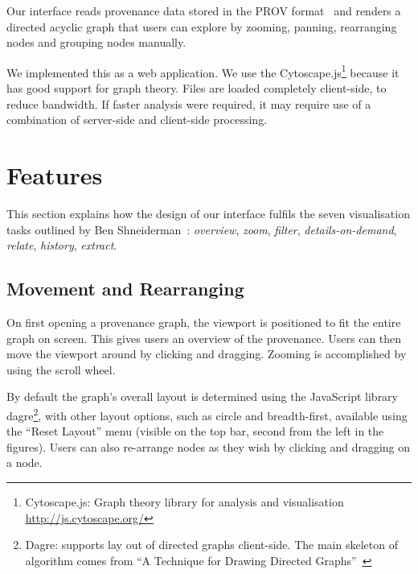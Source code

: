 Our interface reads provenance data stored in the PROV format~\cite{primer2013} and renders a directed acyclic graph that users can explore by zooming, panning, rearranging nodes and grouping nodes manually. 

We implemented this as a web application. We use the Cytoscape.js\footnote{Cytoscape.js: Graph theory library for analysis and visualisation \url{http://js.cytoscape.org/}} because it has good support for graph theory. 
Files are loaded completely client-side, to reduce bandwidth. If faster analysis were required, it may require use of a combination of server-side and client-side processing.


\section{Features}

This section explains how the design of our interface fulfils the seven visualisation tasks outlined by Ben Shneiderman~\cite{Shneiderman1996}: \textit{overview}, \textit{zoom}, \textit{filter}, \textit{details-on-demand}, \textit{relate}, \textit{history}, \textit{extract}. 

\subsection{Movement and Rearranging}
On first opening a provenance graph, the viewport is positioned to fit the entire graph on screen. This gives users an overview of the provenance. Users can then move the viewport around by clicking and dragging. Zooming is accomplished by using the scroll wheel. 

By default the graph's overall layout is determined using the JavaScript library dagre\footnote{Dagre: supports lay out of directed graphs client-side. The main skeleton of algorithm comes from ``A Technique for Drawing Directed Graphs''~\cite{Gansner1993}}, with other layout options, such as circle and breadth-first, available using the ``Reset Layout'' menu (visible on the top bar, second from the left in the figures). Users can also re-arrange nodes as they wish by clicking and dragging on a node. 

